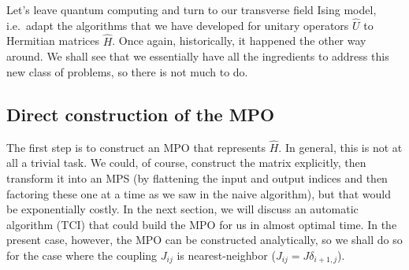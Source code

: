 \documentclass{SciPost}
\begin{document}
Let's leave quantum computing and turn to our transverse field Ising model, i.e.\ adapt
the algorithms that we have developed for unitary operators $\hat U$ to
Hermitian matrices $\hat H$. Once again, historically, it happened the other way around. We shall see that we essentially have all the ingredients
to address this new class of problems, so there is not much to do.

\subsection{Direct construction of the MPO}
The first step is to construct an MPO that represents $\hat H$.  In general, this is not at all a trivial task.  We could, of course, construct the matrix
explicitly, then transform it into an MPS (by flattening the input and output indices and then factoring these one at a time as we saw in the naive algorithm), but that would be exponentially costly.  In the next section, we will discuss an automatic algorithm (TCI) that could build the MPO for us in almost optimal time.  In the present case, however, the MPO can be constructed analytically, so we shall do so for the case where the coupling $J_{ij}$ is nearest-neighbor ($J_{ij} = J \delta_{i+1,j}$).
\end{document}
